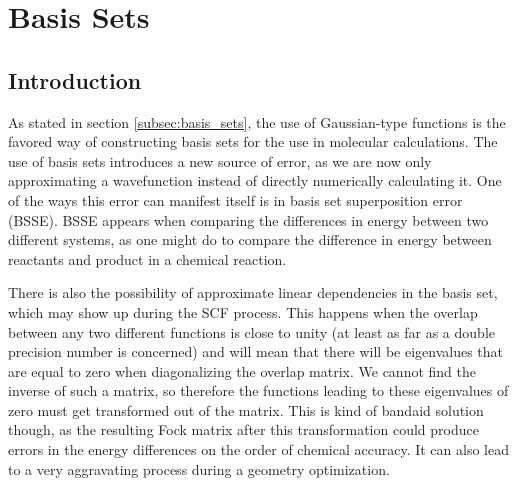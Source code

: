 \chapter{Basis Sets}
\label{chap:basis_sets}
\section{Introduction}
As stated in section \ref{subsec:basis_sets}, the use of Gaussian-type functions is the favored way of constructing basis sets for the use in molecular calculations. The use of basis sets introduces a new source of error, as we are now only approximating a wavefunction instead of directly numerically calculating it. One of the ways this error can manifest itself is in basis set superposition error (BSSE). BSSE appears when comparing the differences in energy between two different systems, as one might do to compare the difference in energy between reactants and product in a chemical reaction. 



There is also the possibility of approximate linear dependencies in the basis set, which may show up during the SCF process. This happens when the overlap between any two different functions is close to unity (at least as far as a double precision number is concerned) and will mean that there will be eigenvalues that are equal to zero when diagonalizing the overlap matrix. We cannot find the inverse of such a matrix, so therefore the functions leading to these eigenvalues of zero must get transformed out of the matrix. This is kind of bandaid solution though, as the resulting Fock matrix after this transformation could produce errors in the energy differences on the order of chemical accuracy. It can also lead to a very aggravating process during a geometry optimization. 

